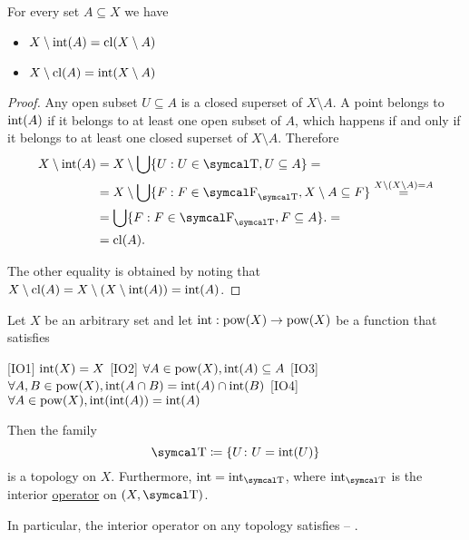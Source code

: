 \begin{proposition}\label{thm:interior_closure_complement} For every set \( A \subseteq X \) we have
  \begin{itemize}
    \item \( X \setminus \operatorname{int}(A) = \operatorname{cl}(X \setminus A) \)
    \item \( X \setminus \operatorname{cl}(A) = \operatorname{int}(X \setminus A) \)
  \end{itemize}
\end{proposition}
\begin{proof}
  Any open subset \( U \subseteq A \) is a closed superset of \( X \setminus A \). A point belongs to \( \operatorname{int}(A) \) if it belongs to at least one open subset of \( A \), which happens if and only if it belongs to at least one closed superset of \( X \setminus A \). Therefore
  \begin{align*}
    X \setminus \Int(A)
    &=
    X \setminus \bigcup \{ U : U \in \CT, U \subseteq A \}
    = \\ &=
    X \setminus \bigcup \{ F : F \in \CF_{\CT}, X \setminus A \subseteq F \}
    \overset {X \setminus (X \setminus A) = A} = \\ &=
    \bigcup \{ F : F \in \CF_{\CT}, F \subseteq A \}.
    = \\ &=
    \Cl(A).
  \end{align*}

  The other equality is obtained by noting that \( X \setminus \operatorname{cl}(A) = X \setminus (X \setminus \operatorname{int}(A)) = \operatorname{int}(A) \).
\end{proof}

\begin{proposition}\label{thm:interior_operator_axioms}
  Let \( X \) be an arbitrary set and let \( \operatorname{int}: \operatorname{pow}(X) \to \operatorname{pow}(X) \) be a function that satisfies
  \begin{description}
    [IO1] \( \operatorname{int}(X) = X \)
    [IO2] \( \forall A \in \operatorname{pow}(X), \operatorname{int}(A) \subseteq A \)
    [IO3] \( \forall A, B \in \operatorname{pow}(X), \operatorname{int}(A \cap B) = \operatorname{int}(A) \cap \operatorname{int}(B) \)
    [IO4] \( \forall A \in \operatorname{pow}(X), \operatorname{int}(\operatorname{int}(A)) = \operatorname{int}(A) \)
  \end{description}

  Then the family
  \begin{equation*}
    \CT \coloneqq \{ U \colon U = \Int(U) \}
  \end{equation*}
  is a topology on \( X \). Furthermore, \( \Int = \Int_{\CT} \), where \( \Int_{\CT} \) is the interior \hyperref[def:interior_operator]{operator} on \( (X, \CT) \).

  In particular, the interior operator on any topology satisfies  -- .
\end{proposition}

